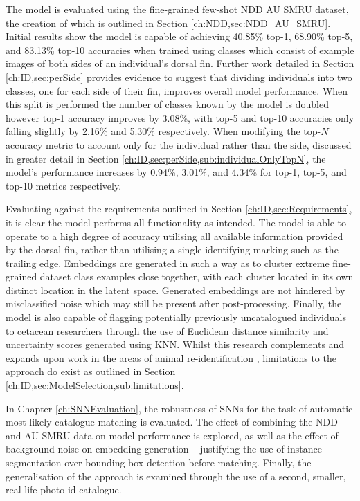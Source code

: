 The model is evaluated using the fine-grained few-shot NDD AU SMRU dataset, the creation of which is outlined in Section \ref{ch:NDD,sec:NDD_AU_SMRU}. Initial results show the model is capable of achieving 40.85\% top-1, 68.90\% top-5, and 83.13\% top-10 accuracies when trained using classes which consist of example images of both sides of an individual's dorsal fin. Further work detailed in Section \ref{ch:ID,sec:perSide} provides evidence to suggest that dividing individuals into two classes, one for each side of their fin, improves overall model performance. When this split is performed the number of classes known by the model is doubled however top-1 accuracy improves by 3.08\%, with top-5 and top-10 accuracies only falling slightly by 2.16\% and 5.30\% respectively. When modifying the top-$N$ accuracy metric to account only for the individual rather than the side, discussed in greater detail in Section \ref{ch:ID,sec:perSide,sub:individualOnlyTopN}, the model's performance increases by 0.94\%, 3.01\%, and 4.34\% for top-1, top-5, and top-10 metrics respectively. 

Evaluating against the requirements outlined in Section \ref{ch:ID,sec:Requirements}, it is clear the model performs all functionality as intended. The model is able to operate to a high degree of accuracy utilising all available information provided by the dorsal fin, rather than utilising a single identifying marking such as the trailing edge. Embeddings are generated in such a way as to cluster extreme fine-grained dataset class examples close together, with each cluster located in its own distinct location in the latent space. Generated embeddings are not hindered by misclassified noise which may still be present after post-processing. Finally, the model is also capable of flagging potentially previously uncatalogued individuals to cetacean researchers through the use of Euclidean distance similarity and uncertainty scores generated using KNN. Whilst this research complements and expands upon work in the areas of animal re-identification \cite{vetrova_hidden_2018, clapham_automated_2020, birenbaum_sealnet_2022}, limitations to the approach do exist as outlined in Section \ref{ch:ID,sec:ModelSelection,sub:limitations}. 

In Chapter \ref{ch:SNNEvaluation}, the robustness of SNNs for the task of automatic most likely catalogue matching is evaluated. The effect of combining the NDD and AU SMRU data on model performance is explored, as well as the effect of background noise on embedding generation -- justifying the use of instance segmentation over bounding box detection before matching. Finally, the generalisation of the approach is examined through the use of a second, smaller, real life photo-id catalogue. 


